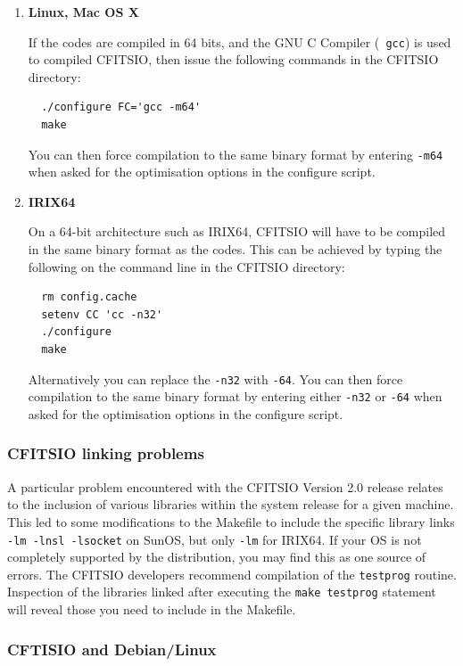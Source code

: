 \documentclass[12pt,twoside]{article}
\begin{document}
\begin{enumerate}
%
\item {\bf Linux, Mac OS X}

If the \healpix codes are compiled in 64 bits, and the GNU C Compiler ({\tt
gcc}) is used to compiled CFITSIO, then issue the following commands in the
CFITSIO directory:

\begin{verbatim}
  ./configure FC='gcc -m64'
  make
\end{verbatim}

You can
then force compilation to the same binary format by entering
{\tt -m64} when asked for the optimisation options in the
\healpix configure script.

\item {\bf IRIX64}

On a 64-bit architecture such as IRIX64, CFITSIO will have to be
compiled in the same  binary format as the \healpix codes.
This can be achieved by typing the
following on the
command line in the CFITSIO directory:
 
\begin{verbatim}
  rm config.cache    
  setenv CC 'cc -n32'
  ./configure
  make
\end{verbatim}

Alternatively you can replace the {\tt -n32} with {\tt -64}. You can
then force compilation to the same binary format by entering either
{\tt -n32} or {\tt -64} when asked for the optimisation options in the
\healpix configure script.
%
\end{enumerate}

\subsubsection{CFITSIO linking problems}

A particular problem encountered with the CFITSIO Version 2.0 release relates
to the inclusion of various libraries within the system release for a given
machine. This led to some modifications to the Makefile to include the specific
library links {\tt -lm -lnsl -lsocket} on SunOS, but only {\tt -lm} for IRIX64.
If your OS is not completely supported by the distribution, you may find this
as one source of errors. The CFITSIO developers recommend compilation of the
{\tt testprog} routine. Inspection of the libraries linked after executing the
{\tt make testprog} statement will reveal those you need to include in the
Makefile.

\subsubsection{CFTISIO and Debian/Linux}
\end{document}
